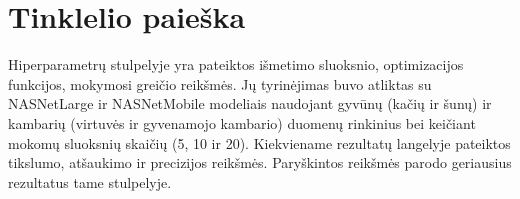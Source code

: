 \documentclass{VUMIFPSbakalaurinis}
\begin{document}
\printbibliography[heading=bibintoc]





\appendix
\section{Tinklelio paieška}
Hiperparametrų stulpelyje yra pateiktos išmetimo sluoksnio, optimizacijos funkcijos, mokymosi greičio reikšmės. Jų tyrinėjimas buvo atliktas su NASNetLarge ir NASNetMobile modeliais naudojant gyvūnų (kačių ir šunų) ir kambarių (virtuvės ir gyvenamojo kambario) duomenų rinkinius bei keičiant mokomų sluoksnių skaičių (5, 10 ir 20). Kiekviename rezultatų langelyje pateiktos tikslumo, atšaukimo ir precizijos reikšmės. Paryškintos reikšmės parodo geriausius rezultatus tame stulpelyje. 
\setlength\LTleft{-0.8in}
\setlength\LTright{-1in}
\end{document}

